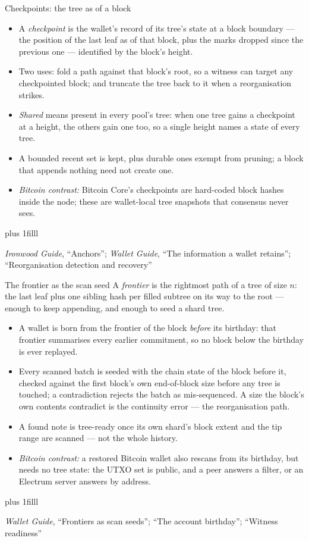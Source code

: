 \documentclass[aspectratio=169,11pt]{beamer}
\newcommand{\src}[1]{\par\vskip0pt plus 1filll
  {\fontsize{6}{7.2}\selectfont\color{arbdim}\raggedright #1\par}}
\begin{document}
\begin{frame}{Checkpoints: the tree as of a block}
\begin{itemize}
  \item A \emph{checkpoint} is the wallet's record of its tree's state at
    a block boundary --- the position of the last leaf as of that block,
    plus the marks dropped since the previous one --- identified by the
    block's height.
  \item Two uses: fold a path against that block's root, so a witness
    can target any checkpointed block; and truncate the tree back to it
    when a reorganisation strikes.
  \item \emph{Shared} means present in every pool's tree: when one tree
    gains a checkpoint at a height, the others gain one too, so a single
    height names a state of every tree.
  \item A bounded recent set is kept, plus durable ones exempt from
    pruning; a block that appends nothing need not create one.
  \item \emph{Bitcoin contrast:} Bitcoin Core's checkpoints are
    hard-coded block hashes inside the node; these are wallet-local tree
    snapshots that consensus never sees.
\end{itemize}
\src{\emph{Ironwood Guide}, ``Anchors''; \emph{Wallet Guide}, ``The information
  a wallet retains''; ``Reorganisation detection and recovery''}
\end{frame}

\begin{frame}{The frontier as the scan seed}
A \emph{frontier} is the rightmost path of a tree of size $n$: the last
leaf plus one sibling hash per filled subtree on its way to the root ---
enough to keep appending, and enough to seed a shard tree.
\begin{itemize}
  \item A wallet is born from the frontier of the block \emph{before} its
    birthday: that frontier summarises every earlier commitment, so no
    block below the birthday is ever replayed.
  \item Every scanned batch is seeded with the chain state of the block
    before it, checked against the first block's own end-of-block size
    before any tree is touched; a contradiction rejects the batch as
    mis-sequenced. A size the block's own contents contradict is the
    continuity error --- the reorganisation path.
  \item A found note is tree-ready once its own shard's block extent and
    the tip range are scanned --- not the whole history.
  \item \emph{Bitcoin contrast:} a restored Bitcoin wallet also rescans
    from its birthday, but needs no tree state: the UTXO set is public,
    and a peer answers a filter, or an Electrum server answers by
    address.
\end{itemize}
\src{\emph{Wallet Guide}, ``Frontiers as scan seeds''; ``The account
  birthday''; ``Witness readiness''}
\end{frame}
\end{document}
